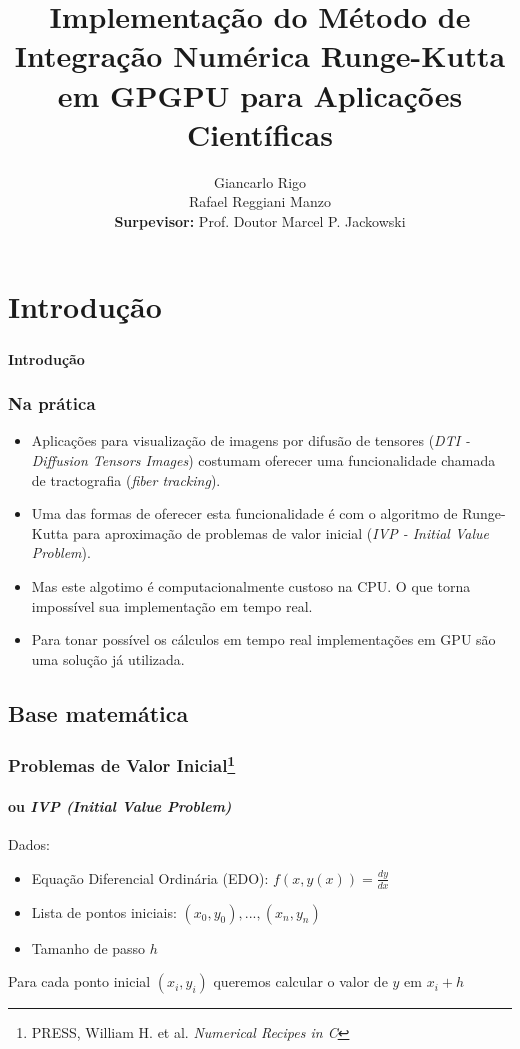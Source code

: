 \documentclass[brazil, 10pt]{beamer}
\title{Implementação do Método de Integração Numérica Runge-Kutta em GPGPU para Aplicações Científicas}
\author{Giancarlo Rigo\\
        Rafael Reggiani Manzo\\
        \textbf{Surpevisor:} Prof. Doutor Marcel P. Jackowski}
\begin{document}
\maketitle

\section{Introdução}
\begin{frame}
  \frametitle{}
  \framesubtitle{}
  \begin{Large}
  \begin{center}
  \textbf{Introdução}
  \end{center}
  \end{Large}
\end{frame}

\begin{frame}
  \frametitle{Na prática}
  
  \begin{itemize}
    \item Aplicações para visualização de imagens por difusão de tensores (\textit{DTI - Diffusion Tensors Images}) costumam oferecer uma funcionalidade chamada de tractografia (\textit{fiber tracking}).
    \item Uma das formas de oferecer esta funcionalidade é com o algoritmo de Runge-Kutta para aproximação de problemas de valor inicial (\textit{IVP - Initial Value Problem}).
    \item Mas este algotimo é computacionalmente custoso na CPU. O que torna impossível sua implementação em tempo real.
    \item Para tonar possível os cálculos em tempo real implementações em GPU são uma solução já utilizada. 
  \end{itemize}
  
\end{frame}

\subsection{Base matemática}
\begin{frame}
  \frametitle{Problemas de Valor Inicial\footnote{PRESS, William H. et al. \textit{Numerical Recipes in C}}}
  \framesubtitle{ou \textit{IVP (Initial Value Problem)}}

  Dados:
  \begin{itemize}
    \item Equação Diferencial Ordinária (EDO): $f(x, y(x)) = \frac{dy}{dx} $
    \item Lista de pontos iniciais: $ (x_{0}, y_{0}),...,(x_{n},y_{n}) $
    \item Tamanho de passo $ h $
  \end{itemize}
   
  Para cada ponto inicial $ (x_{i}, y_{i}) $ queremos calcular o valor de $ y $ em $ x_{i} + h $ 
\end{frame}
\end{document}

